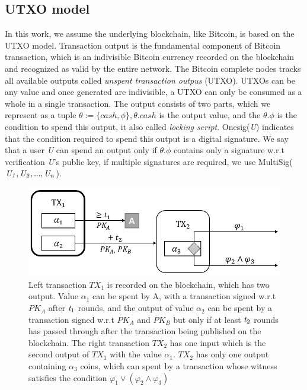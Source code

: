 \documentclass[conference]{IEEEtran}
\begin{document}
\subsection{UTXO model}
In this work, we assume the underlying blockchain, like Bitcoin, is based on the UTXO model. Transaction output is 
the fundamental component of Bitcoin transaction, which is an indivisible Bitcoin currency recorded on the blockchain 
and recognized as valid by the entire network. The Bitcoin complete nodes tracks all available outputs called 
\emph{unspent transaction outpus} (UTXO). UTXOs can be any value and once generated are indivisible, a UTXO can only 
be consumed as a whole in a single transaction. The output consists of two parts, which we represent as a 
tuple $\theta :=\{cash,\phi\}, \theta.cash$ is the output value, and the $\theta.\phi$ is the condition to spend 
this output, it also called \emph{locking script}. Onesig(\emph{U}) indicates that the condition required to 
spend this output is a digital signature. We say that a user \emph{U} can spend an output only if $\theta.\phi$ 
contains only a signature w.r.t verification  \emph{U}'s public key, if multiple signatures are required, we use 
MultiSig($\it U_1,U_2,...,U_n$).

\begin{figure}[t]
	\centering
	\includegraphics[scale=0.5]{fig2.png}
	\caption{Left transaction $TX_1$ is recorded on the blockchain, which has two output. Value $\alpha_1$ can be spent 
	by A, with a transaction signed w.r.t $PK_A$ after $\emph{t}_1$ rounds, and the output of value $\alpha_2$ can 
	be spent by a transaction signed w.r.t $PK_A$ and $PK_B$ but only if at least $\emph{t}_2$ rounds has passed 
	through after the transaction being published on the blockchain. The right transaction $TX_2$ has one input 
	which is the second output of $TX_1$ with the value $\alpha_1$. $TX_2$ has only one output containing $\alpha_3$ 
	coins, which can spent by a transaction whose witness satisfies the condition $\varphi_1 \vee (\varphi_2 \wedge \varphi_3)$}
\end{figure}
\end{document}
